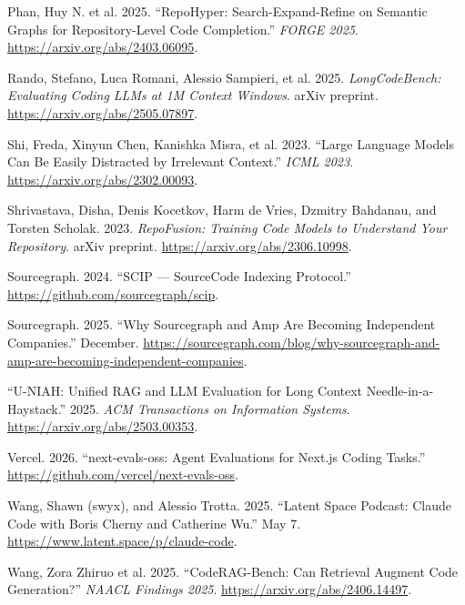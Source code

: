 \documentclass[
  11pt,
  letterpaper,
  numbers=noendperiod,
  parskip=half]{scrartcl}
\newlength{\cslhangindent}
\newenvironment{CSLReferences}[2] %
 {\begin{list}{}{%
  \setlength{\itemindent}{0pt}
  \setlength{\leftmargin}{0pt}
  \setlength{\parsep}{0pt}
  \ifodd #1
   \setlength{\leftmargin}{\cslhangindent}
   \setlength{\itemindent}{-1\cslhangindent}
  \fi
  \setlength{\itemsep}{#2\baselineskip}}}
 {\end{list}}
\begin{document}
\begin{CSLReferences}{1}{1}
{Phan, Huy N. et al.} 2025. {``{RepoHyper}: Search-Expand-Refine on
Semantic Graphs for Repository-Level Code Completion.''} \emph{FORGE
2025}. \url{https://arxiv.org/abs/2403.06095}.

Rando, Stefano, Luca Romani, Alessio Sampieri, et al. 2025.
\emph{{LongCodeBench}: Evaluating Coding LLMs at 1M Context Windows}.
arXiv preprint. \url{https://arxiv.org/abs/2505.07897}.

Shi, Freda, Xinyun Chen, Kanishka Misra, et al. 2023. {``Large Language
Models Can Be Easily Distracted by Irrelevant Context.''} \emph{ICML
2023}. \url{https://arxiv.org/abs/2302.00093}.

Shrivastava, Disha, Denis Kocetkov, Harm de Vries, Dzmitry Bahdanau, and
Torsten Scholak. 2023. \emph{{RepoFusion}: Training Code Models to
Understand Your Repository}. arXiv preprint.
\url{https://arxiv.org/abs/2306.10998}.

Sourcegraph. 2024. {``{SCIP} --- {SourceCode Indexing Protocol}.''}
\url{https://github.com/sourcegraph/scip}.

Sourcegraph. 2025. {``Why {Sourcegraph} and {Amp} Are Becoming
Independent Companies.''} December.
\url{https://sourcegraph.com/blog/why-sourcegraph-and-amp-are-becoming-independent-companies}.

{``{U-NIAH}: Unified {RAG} and {LLM} Evaluation for Long Context
Needle-in-a-Haystack.''} 2025. \emph{ACM Transactions on Information
Systems}. \url{https://arxiv.org/abs/2503.00353}.

Vercel. 2026. {``{next-evals-oss}: Agent Evaluations for {Next.js}
Coding Tasks.''} \url{https://github.com/vercel/next-evals-oss}.

Wang, Shawn (swyx), and Alessio Trotta. 2025. {``{Latent Space} Podcast:
{Claude Code} with Boris Cherny and Catherine Wu.''} May 7.
\url{https://www.latent.space/p/claude-code}.

{Wang, Zora Zhiruo et al.} 2025. {``{CodeRAG-Bench}: Can Retrieval
Augment Code Generation?''} \emph{NAACL Findings 2025}.
\url{https://arxiv.org/abs/2406.14497}.


\end{CSLReferences}
\end{document}
